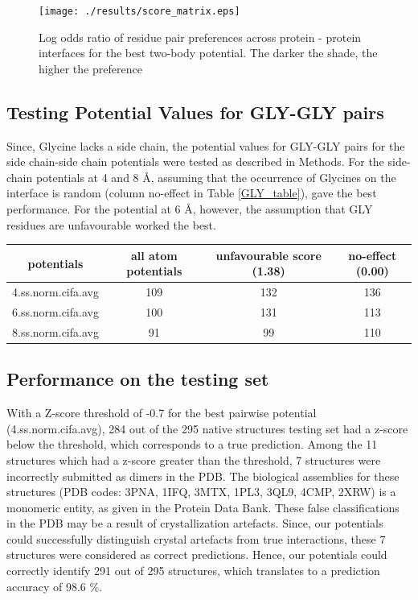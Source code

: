 \begin{figure}[ht]
	\centering
	\texttt{[image: ./results/score\_matrix.eps]}
	\caption[Log odds ratio matrix of Residue Pair preferences in pairwise potential]{Log odds ratio of residue pair preferences across protein - protein interfaces for the best two-body potential. The darker the shade, the higher the preference}
	\label{score_matrix}
\end{figure}

\subsection{Testing Potential Values for GLY-GLY pairs}
Since, Glycine lacks a side chain, the potential values for GLY-GLY pairs for the side chain-side chain potentials were tested as described in Methods. For the side-chain potentials at 4 and 8 \AA \;, assuming that the occurrence of Glycines on the interface is random (column no-effect in Table \ref{GLY_table}), gave the best performance. For the potential at 6 \AA, \; however, the assumption that GLY residues are unfavourable worked the best.

\begin{center}
	\begin{tabular}{ | c | c | c | c |}
	\hline
	potentials & all atom potentials & unfavourable score (1.38) & no-effect (0.00) \\ \hline
	4.ss.norm.cifa.avg & 109 & 132 & 136 \\ \hline
	6.ss.norm.cifa.avg & 100 & 131 & 113 \\ \hline
	8.ss.norm.cifa.avg & 91 & 99 & 110 \\ \hline
	\end{tabular}
	\label{GLY_table}
\end{center}

\vfill

\subsection{Performance on the testing set}
With a Z-score threshold of -0.7 for the best pairwise potential (4.ss.norm.cifa.avg), 284 out of the 295 native structures testing set had a z-score below the threshold, which corresponds to a true prediction. Among the 11 structures which had a z-score greater than the threshold, 7 structures were incorrectly submitted as dimers in the PDB. The biological assemblies for these structures (PDB codes: 3PNA, 1IFQ, 3MTX, 1PL3, 3QL9, 4CMP, 2XRW) is a monomeric entity, as given in the Protein Data Bank. These false classifications in the PDB may be a result of crystallization artefacts. Since, our potentials could successfully distinguish crystal artefacts from true interactions, these 7 structures were considered as correct predictions. Hence, our potentials could correctly identify 291 out of 295 structures, which translates to a prediction accuracy of 98.6 \%.

